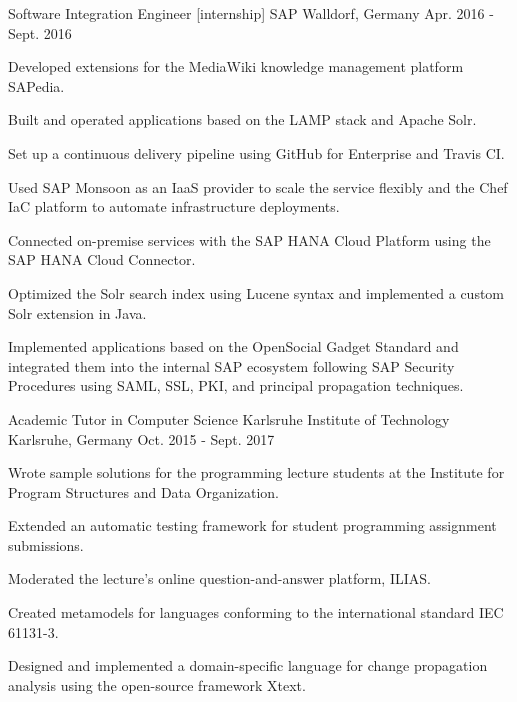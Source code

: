\begin{cventries}
\cventry
{Software Integration Engineer [internship]} %
{SAP} %
{Walldorf, Germany} %
{Apr. 2016 - Sept. 2016} %
{
  \begin{cvitems} %
    \item {Developed extensions for the MediaWiki knowledge management platform SAPedia.}
    \item {Built and operated applications based on the LAMP stack and Apache Solr.}
    \item {Set up a continuous delivery pipeline using GitHub for Enterprise and Travis CI.}
    \item {Used SAP Monsoon as an IaaS provider to scale the service flexibly and the Chef IaC platform to automate infrastructure deployments.}
    \item {Connected on-premise services with the SAP HANA Cloud Platform using the SAP HANA Cloud Connector.}
    \item {Optimized the Solr search index using Lucene syntax and implemented a custom Solr extension in Java.}
    \item {Implemented applications based on the OpenSocial Gadget Standard and integrated them into the internal SAP ecosystem following SAP Security Procedures using SAML, SSL, PKI, and principal propagation techniques.}
  \end{cvitems}
}

\cventry
{Academic Tutor in Computer Science} %
{Karlsruhe Institute of Technology} %
{Karlsruhe, Germany} %
{Oct. 2015 - Sept. 2017} %
{
  \begin{cvitems} %
    \item {Wrote sample solutions for the programming lecture students at the Institute for Program Structures and Data Organization.}
    \item {Extended an automatic testing framework for student programming assignment submissions.}
    \item {Moderated the lecture's online question-and-answer platform, ILIAS.}
    \item {Created metamodels for languages conforming to the international standard IEC 61131-3.}
    \item {Designed and implemented a domain-specific language for change propagation analysis using the open-source framework Xtext.}
  \end{cvitems}
}


\end{cventries}
